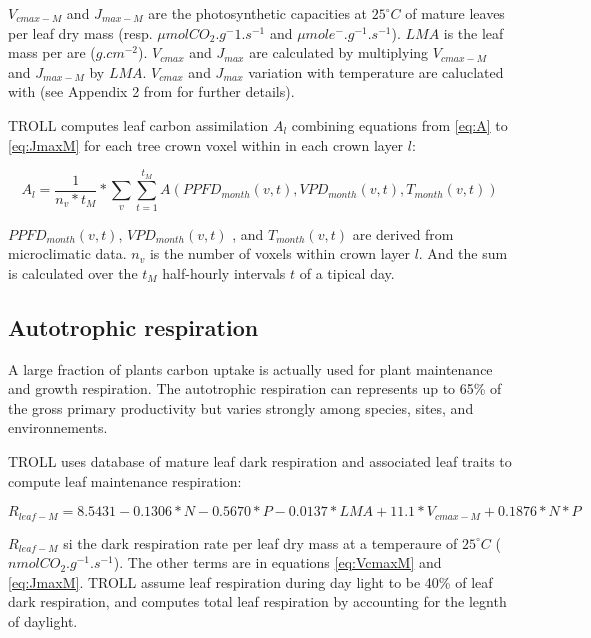 \documentclass[12pt,]{article}
\theoremstyle{definition}
\theoremstyle{definition}
\theoremstyle{remark}
\begin{document}
\(V_{cmax-M}\) and \(J_{max-M}\) are the photosynthetic capacities at
\(25^\circ C\) of mature leaves per leaf dry mass (resp.
\(\mu mol CO_2.g^-1.s^{-1}\) and \(\mu mol e^-.g^{-1}.s^{-1}\)). \(LMA\)
is the leaf mass per are (\(g.cm^{-2}\)). \(V_{cmax}\) and \(J_{max}\)
are calculated by multiplying \(V_{cmax-M}\) and \(J_{max-M}\) by
\(LMA\). \(V_{cmax}\) and \(J_{max}\) variation with temperature are
caluclated with \citet{Bernacchi2003} (see Appendix 2 from \citet{Li}
for further details).

TROLL computes leaf carbon assimilation \(A_l\) combining equations from
\eqref{eq:A} to \eqref{eq:JmaxM} for each tree crown voxel within in each
crown layer \(l\):

\begin{equation}
  A_l = \frac{1}{n_v*t_M} * \sum_v  \sum^{t_M}_{t=1} A(PPFD_{month}(v,t),VPD_{month}(v,t),T_{month}(v,t))
  \label{eq:Al}
\end{equation}

\(PPFD_{month}(v,t)\), \(VPD_{month}(v,t)\) , and \(T_{month}(v,t)\) are
derived from microclimatic data. \(n_v\) is the number of voxels within
crown layer \(l\). And the sum is calculated over the \(t_M\)
half-hourly intervals \(t\) of a tipical day.

\subsection{Autotrophic respiration}\label{autotrophic-respiration}

A large fraction of plants carbon uptake is actually used for plant
maintenance and growth respiration. The autotrophic respiration can
represents up to 65\% of the gross primary productivity but varies
strongly among species, sites, and environnements.

TROLL uses \citet{Atkin2015} database of mature leaf dark respiration
and associated leaf traits to compute leaf maintenance respiration:

\begin{equation}
  R_{leaf-M} = 8.5431-0.1306*N-0.5670*P-0.0137*LMA+11.1*V_{cmax-M}+0.1876*N*P
  \label{eq:Rl}
\end{equation}

\(R_{leaf-M}\) si the dark respiration rate per leaf dry mass at a
temperaure of \(25^\circ C\) (\(nmolCO_2.g^{-1}.s^{-1}\)). The other
terms are in equations \eqref{eq:VcmaxM} and \eqref{eq:JmaxM}. TROLL assume
leaf respiration during day light to be 40\% of leaf dark respiration,
and computes total leaf respiration by accounting for the legnth of
daylight.
\end{document}
